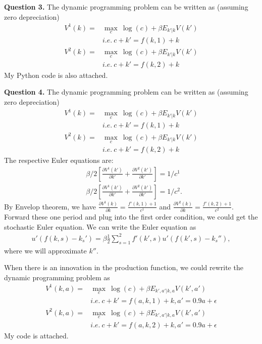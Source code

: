\documentclass[12pt]{article}
\begin{document}
\begin{spacing}{1.3}
\textbf{Question 3. }The dynamic programming problem can be written as (assuming zero depreciation)
\begin{align*}
V^1(k)=&\max_c~\log(c)+\beta E_{k'|k} V(k')\\
&i.e.~c+k'=f(k,1)+k\\
V^2(k)=&\max_c~\log(c)+\beta E_{k'|k} V(k')\\
&i.e.~c+k'=f(k,2)+k
\end{align*}
My Python code is also attached.

\textbf{Question 4. }The dynamic programming problem can be written as (assuming zero depreciation)
\begin{align*}
V^1(k)=&\max_c~\log(c)+\beta E_{k'|k} V(k')\\
&i.e.~c+k'=f(k,1)+k\\
V^2(k)=&\max_c~\log(c)+\beta E_{k'|k} V(k')\\
&i.e.~c+k'=f(k,2)+k
\end{align*}
The respective Euler equations are: 
\begin{align*}
&\beta/2 [\frac{\partial V^1(k')}{\partial k'}+\frac{\partial V^2(k')}{\partial k'}]=1/c^1\\
&\beta/2 [\frac{\partial V^1(k')}{\partial k'}+\frac{\partial V^2(k')}{\partial k'}]=1/c^2.
\end{align*}
By Envelop theorem, we have $\frac{\partial V^1(k)}{\partial k}=\frac{f'(k,1)+1}{c^1}$ and $\frac{\partial V^2(k)}{\partial k}=\frac{f'(k,2)+1}{c^2}$. Forward these one period and plug into the first order condition, we could get the stochastic Euler equation. We can write the Euler equation as
\begin{align*}
u'(f(k,s)-k_s')=\beta\frac{1}{2}\sum_{s=1}^{2}f'(k',s)u'(f(k',s)-k_s''),
\end{align*}
where we will approximate $k''$.

When there is an innovation in the production function, we could rewrite the dynamic programming problem as
\begin{align*}
V^1(k,a)=&\max_c~\log(c)+\beta E_{k',a'|k,a} V(k',a')\\
&i.e.~c+k'=f(a,k,1)+k, a'=0.9a+\epsilon\\
V^2(k,a)=&\max_c~\log(c)+\beta E_{k',a'|k,a} V(k',a')\\
&i.e.~c+k'=f(a,k,2)+k,a'=0.9a+\epsilon
\end{align*}
My code is attached.


\end{spacing}
\end{document}
